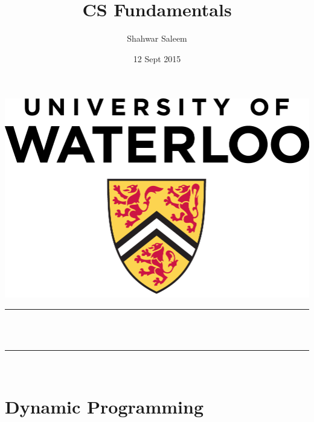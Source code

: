 \documentclass[12pt]{article}
\title{CS Fundamentals}                                %
\author{Shahwar Saleem}                               %
\date{12 Sept 2015}                                         %
\makeatletter
\let\thetitle\@title
\makeatother
\begin{document}

\begin{titlepage}
    \centering
    \vspace*{0.5 cm}
    \includegraphics[scale = 0.75]{logo_waterloo.png}\\[1.0 cm]  %
    \rule{\linewidth}{0.2 mm} \\[0.4 cm]
    { \huge \bfseries \thetitle}\\
    \rule{\linewidth}{0.2 mm} \\[1.5 cm]
    

    
    
    
    
    
    
    
\end{titlepage}


\tableofcontents
\pagebreak


\section{Dynamic Programming}
\end{document}
